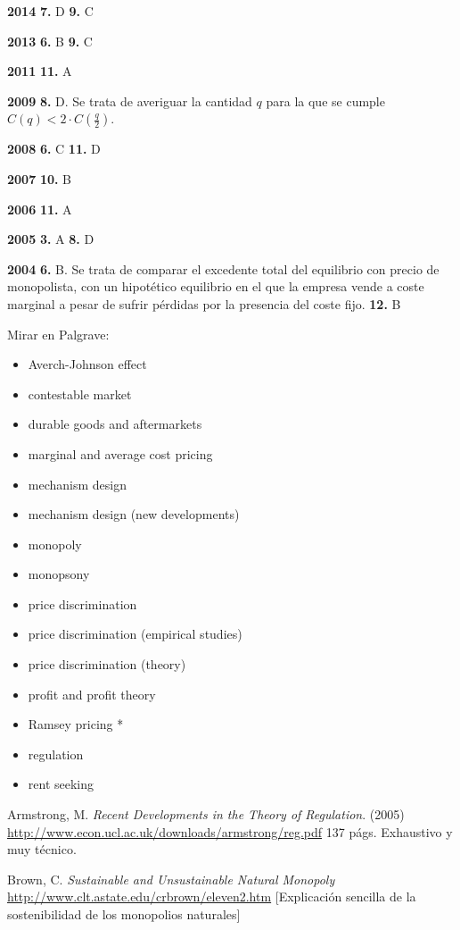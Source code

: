 \documentclass{nuevotema}
\begin{document}
\textbf{2014} \textbf{7.} D \textbf{9.} C

\textbf{2013} \textbf{6.} B \textbf{9.} C

\textbf{2011} \textbf{11.} A

\textbf{2009} \textbf{8.} D. Se trata de averiguar la cantidad $q$ para la que se cumple $C(q) < 2\cdot C(\frac{q}{2})$.

\textbf{2008} \textbf{6.} C \textbf{11.} D

\textbf{2007} \textbf{10.} B

\textbf{2006} \textbf{11.} A

\textbf{2005} \textbf{3.} A \textbf{8.} D

\textbf{2004} \textbf{6.} B. Se trata de comparar el excedente total del equilibrio con precio de monopolista, con un hipotético equilibrio en el que la empresa vende a coste marginal a pesar de sufrir pérdidas por la presencia del coste fijo. \textbf{12.} B

\bibliografia

Mirar en Palgrave:
\begin{itemize}
	\item Averch-Johnson effect
	\item contestable market
	\item durable goods and aftermarkets
	\item marginal and average cost pricing
	\item mechanism design
	\item mechanism design (new developments)
	\item monopoly
	\item monopsony
	\item price discrimination
	\item price discrimination (empirical studies)
	\item price discrimination (theory)
	\item profit and profit theory
	\item Ramsey pricing *
	\item regulation
	\item rent seeking
\end{itemize}


Armstrong, M. \textit{Recent Developments in the Theory of Regulation}. (2005) \url{http://www.econ.ucl.ac.uk/downloads/armstrong/reg.pdf} 137 págs. Exhaustivo y muy técnico.

Brown, C. \textit{Sustainable and Unsustainable Natural Monopoly} \url{http://www.clt.astate.edu/crbrown/eleven2.htm} [Explicación sencilla de la sostenibilidad de los monopolios naturales]
\end{document}
